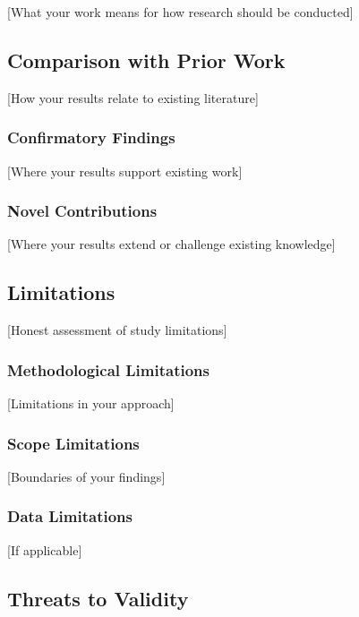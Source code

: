\documentclass[
]{article}
\begin{document}
{[}What your work means for how research should be conducted{]}

\subsection{Comparison with Prior
Work}\label{comparison-with-prior-work}

{[}How your results relate to existing literature{]}

\subsubsection{Confirmatory Findings}\label{confirmatory-findings}

{[}Where your results support existing work{]}

\subsubsection{Novel Contributions}\label{novel-contributions}

{[}Where your results extend or challenge existing knowledge{]}

\subsection{Limitations}\label{limitations}

{[}Honest assessment of study limitations{]}

\subsubsection{Methodological
Limitations}\label{methodological-limitations}

{[}Limitations in your approach{]}

\subsubsection{Scope Limitations}\label{scope-limitations}

{[}Boundaries of your findings{]}

\subsubsection{Data Limitations}\label{data-limitations}

{[}If applicable{]}

\subsection{Threats to Validity}\label{threats-to-validity}
\end{document}
